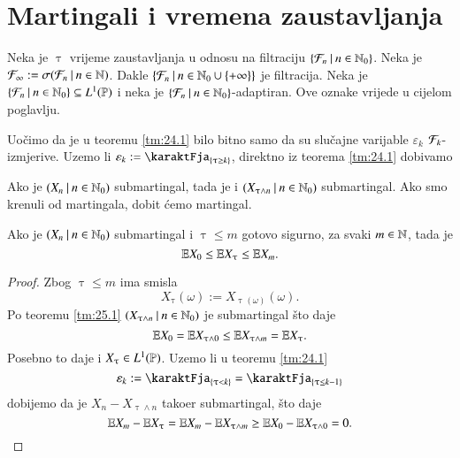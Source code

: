 
\chapter{Martingali i vremena zaustavljanja}

Neka je $\uptau$ vrijeme zaustavljanja u odnosu na filtraciju $\{{\mathcal{F}_n} \: | \: {n \in \mathbb{N}_0}\}$.
Neka je $\mathcal{F}_\infty := \sigma({\mathcal{F}_n} \: | \: {n \in \mathbb{N}})$.
Dakle $\{{\mathcal{F}_n} \: | \: {n \in \mathbb{N}_0 \cup \{+\infty\}}\}$ je filtracija.
Neka je $\{{\mathcal{F}_n} \: | \: {n \in \mathbb{N}_0 }\} \subseteq L^1 (\mathbb{P})$ i neka je $\{{\mathcal{F}_n} \: | \: {n \in \mathbb{N}_0}\}$-adaptiran.
Ove oznake vrijede u cijelom poglavlju.

Uo\v cimo da je u teoremu \ref{tm:24.1} bilo bitno samo da su slu\v cajne varijable $\varepsilon_k$ $\mathcal{F}_k$-izmjerive.
Uzemo li $\varepsilon_k := \karaktFja_{\{\uptau \geq k\}}$, direktno iz teorema \ref{tm:24.1} dobivamo

\begin{tm}  \label{tm:25.1}
    Ako je $({X_n} \: | \: {n \in \mathbb{N}_0})$ submartingal, tada je i $({X_{\uptau \land n}} \: | \: {n \in \mathbb{N}_0})$ submartingal.
    Ako smo krenuli od martingala, dobit \' cemo martingal.
\end{tm}

\begin{kor} \label{kor:25.2}
    Ako je $({X_n} \: | \: {n \in \mathbb{N}_0})$ submartingal i $\uptau \leq m$ gotovo sigurno, za svaki $m \in \mathbb{N}$, tada je
    \begin{equation*}
        \mathbb{E} X_0 \leq \mathbb{E} X_\uptau \leq \mathbb{E} X_m.
    \end{equation*}
\end{kor}

\begin{proof}
    Zbog $\uptau \leq m$ ima smisla
    \begin{equation*}
        X_\uptau (\omega) := X_{\uptau (\omega)} (\omega).
    \end{equation*}
    Po teoremu \ref{tm:25.1} $({X_{\uptau \land n}} \: | \: {n \in \mathbb{N}_0})$ je submartingal \v sto daje
    \begin{equation*}
        \mathbb{E} X_0 = \mathbb{E} X_{\uptau \land 0} \leq \mathbb{E} X_{\uptau \land m} = \mathbb{E} X_\uptau.
    \end{equation*}
    Posebno to daje i $X_\uptau \in L^1 (\mathbb{P})$.
    Uzemo li u teoremu \ref{tm:24.1}
    \begin{equation*}
        \varepsilon_k := \karaktFja_{\{ \uptau < k \}} = \karaktFja_{\{ \uptau \leq k - 1 \}}
    \end{equation*}
    dobijemo da je $X_n - X_{\uptau \land n}$ tako\dj er submartingal, \v sto daje
    \begin{equation*}
        \mathbb{E} X_m - \mathbb{E} X_\uptau = \mathbb{E} X_m - \mathbb{E} X_{\uptau \land m} \geq \mathbb{E} X_0 - \mathbb{E} X_{\uptau \land 0} = 0.
    \end{equation*}
\end{proof}

